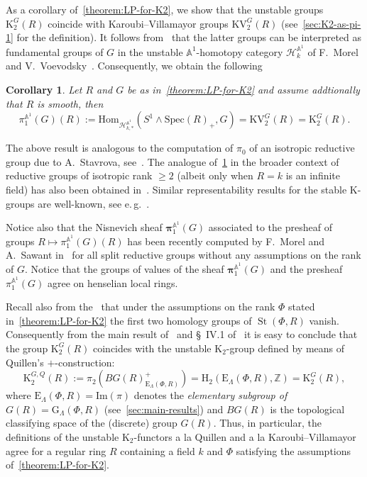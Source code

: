 \documentclass[oneside, 11pt]{amsart} \pdfoutput=1
\newcommand{\K}{{\mathrm{K}}}
\newcommand{\St}{\mathop{\mathrm{St}}\nolimits}
\newcommand{\E}{\mathrm{E}}
\numberwithin{equation}{section}
\newtheorem{corollary}[lemma]{Corollary}
\theoremstyle{definition}
\newcommand{\ZZ}{\mathbb{Z}}
\begin{document}
As a corollary of~\cref{theorem:LP-for-K2}, we show that the unstable groups $\K_2^G(R)$ coincide with Karoubi--Villamayor groups $\mathrm{KV}_2^G(R)$ (see~\cref{sec:K2-as-pi-1} for the definition). It follows from~\cite{AHW18} that the latter groups can be interpreted as fundamental groups of $G$ in the unstable $\mathbb{A}^1$-homotopy category $\mathcal{H}^{\mathbb{A}^1}_{k}$ of F.~Morel and V.~Voevodsky~\cite{MV99}. Consequently, we obtain the following
\begin{corollary} \label{cor:motivic-pi1} Let $R$ and $G$ be as in~\cref{theorem:LP-for-K2} and assume addtionally that $R$ is smooth, then
\[ \pi_1^{\mathbb{A}^1}(G)(R) := \mathrm{Hom}_{\mathcal{H}^{\mathbb{A}^1}_{k,*}}(S^1 \wedge \mathrm{Spec}(R)_+, G) = \mathrm{KV}_2^{G}(R) = \K_2^G(R).\]
\end{corollary}
The above result is analogous to the computation of $\pi_0$ of an isotropic reductive group due to A.~Stavrova, see~\cite[Theorem~5.5]{Sta20}. The analogue of~\cref{cor:motivic-pi1} in the broader context of reductive groups of isotropic rank $\geq 2$ (albeit only when $R = k$ is an infinite field) has also been obtained in~\cite{VW16}.
Similar representability results for the stable $\K$-groups are well-known, see e.\,g.~\cite{MV99, Ho05}.

Notice also that the Nisnevich sheaf $\bm{\pi}_1^{\mathbb{A}^1}(G)$ associated to the presheaf of groups $R \mapsto \pi_1^{\mathbb{A}^1}(G)(R)$ has been recently computed by F.~Morel and A.~Sawant in~\cite{MS20} for all split reductive groups without any assumptions on the rank of $G$. Notice that the groups of values of the sheaf $\bm{\pi}_1^{\mathbb{A}^1}(G)$ and the presheaf $\pi_1^{\mathbb{A}^1}(G)$ agree on henselian local rings.

Recall also from the~\cite[Theorem~5.3]{St71} that under the assumptions on the rank $\Phi$ stated in~\cref{theorem:LP-for-K2} the first two homology groups of $\St(\Phi, R)$ vanish. Consequently from the main result of~\cite{LSV20} and \S~IV.1 of~\cite{Kbook} it is easy to conclude that the group $\K_2^G(R)$ coincides with the unstable $\K_2$-group defined by means of Quillen's $+$-construction:
\begin{equation} \label{eq:H2-K2}
  \K_{2}^{G,Q}(R) := \pi_2(BG(R)^+_{\E_\Lambda(\Phi, R)}) = \mathrm{H}_2(\mathrm{E}_\Lambda(\Phi, R), \ZZ) = \K_2^G(R),
\end{equation}
where $\E_\Lambda(\Phi, R) = \mathrm{Im}(\pi)$ denotes the {\it elementary subgroup of $G(R) = \mathrm{G}_\Lambda(\Phi, R)$}  (see~\cref{sec:main-results}) and $BG(R)$ is the topological classifying space of the (discrete) group $G(R)$. Thus, in particular, the definitions of the unstable $\K_2$-functors a la Quillen and a la Karoubi--Villamayor agree for a regular ring $R$ containing a field $k$ and $\Phi$ satisfying the assumptions of~\cref{theorem:LP-for-K2}.
\end{document}
